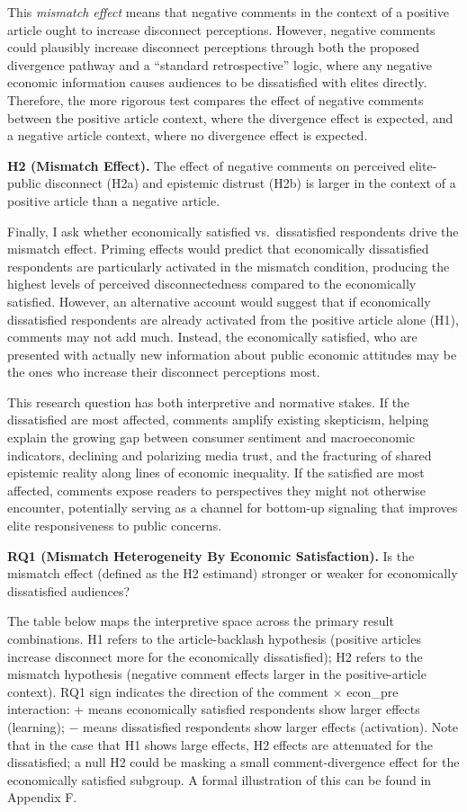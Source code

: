 \documentclass[
  12pt]{article}
\begin{document}
This \emph{mismatch effect} means that negative comments in the context
of a positive article ought to increase disconnect perceptions. However,
negative comments could plausibly increase disconnect perceptions
through both the proposed divergence pathway and a ``standard
retrospective'' logic, where any negative economic information causes
audiences to be dissatisfied with elites directly. Therefore, the more
rigorous test compares the effect of negative comments between the
positive article context, where the divergence effect is expected, and a
negative article context, where no divergence effect is expected.

\textbf{H2 (Mismatch Effect).} The effect of negative comments on
perceived elite-public disconnect (H2a) and epistemic distrust (H2b) is
larger in the context of a positive article than a negative article.

Finally, I ask whether economically satisfied vs.~dissatisfied
respondents drive the mismatch effect. Priming effects would predict
that economically dissatisfied respondents are particularly activated in
the mismatch condition, producing the highest levels of perceived
disconnectedness compared to the economically satisfied. However, an
alternative account would suggest that if economically dissatisfied
respondents are already activated from the positive article alone (H1),
comments may not add much. Instead, the economically satisfied, who are
presented with actually new information about public economic attitudes
may be the ones who increase their disconnect perceptions most.

This research question has both interpretive and normative stakes. If
the dissatisfied are most affected, comments amplify existing
skepticism, helping explain the growing gap between consumer sentiment
and macroeconomic indicators, declining and polarizing media trust, and
the fracturing of shared epistemic reality along lines of economic
inequality. If the satisfied are most affected, comments expose readers
to perspectives they might not otherwise encounter, potentially serving
as a channel for bottom-up signaling that improves elite responsiveness
to public concerns.

\textbf{RQ1 (Mismatch Heterogeneity By Economic Satisfaction).} Is the
mismatch effect (defined as the H2 estimand) stronger or weaker for
economically dissatisfied audiences?

The table below maps the interpretive space across the primary result
combinations. H1 refers to the article-backlash hypothesis (positive
articles increase disconnect more for the economically dissatisfied); H2
refers to the mismatch hypothesis (negative comment effects larger in
the positive-article context). RQ1 sign indicates the direction of the
comment × econ\_pre interaction: + means economically satisfied
respondents show larger effects (learning); − means dissatisfied
respondents show larger effects (activation). Note that in the case that
H1 shows large effects, H2 effects are attenuated for the dissatisfied;
a null H2 could be masking a small comment-divergence effect for the
economically satisfied subgroup. A formal illustration of this can be
found in Appendix F.
\end{document}
